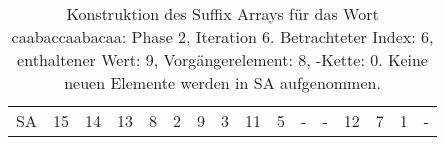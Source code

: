\begin{table}[H]
\begin{adjustbox}{max width=\textwidth}
\begin{tabular}{lccccccccccccccc}
\multicolumn{1}{l|}{SA}      & \multicolumn{1}{c|}{15} & 14 & \multicolumn{1}{c|}{13} & \multicolumn{1}{c|}{8}     & \multicolumn{1}{c|}{2}      & \multicolumn{1}{c|}{\cellcolor[HTML]{\green}9} & \multicolumn{1}{c|}{3}     & \multicolumn{1}{c|}{11} & \multicolumn{1}{c|}{5}   & -  & \multicolumn{1}{c|}{-}  & 12  & 7   & 1   & -  
\end{tabular}
\end{adjustbox}

\caption[Konstruktion des Suffix Arrays f{\"u}r das Wort caabaccaabacaa: Phase 2, Iteration 6]{Konstruktion des Suffix Arrays f{\"u}r das Wort caabaccaabacaa: Phase 2, Iteration 6. Betrachteter Index: 6, enthaltener Wert: 9, Vorg{\"a}ngerelement: 8, \prevpointer-Kette: 0. Keine neuen Elemente werden in SA aufgenommen.}
\label{table_complex_example_2_6} 
\end{table}

